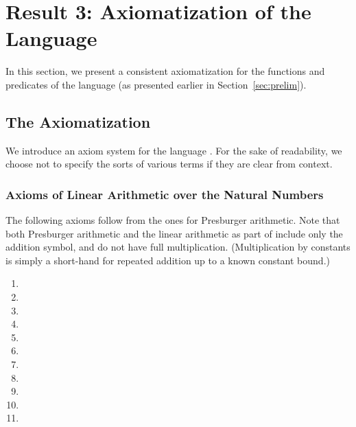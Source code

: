 \section{Result 3: Axiomatization  of the Language }
\label{sec:soundness}

In this section, we present a consistent
axiomatization  for the functions and predicates of the
language  (as presented earlier in Section~\ref{sec:prelim}).

\subsection{The Axiomatization }
\label{sec:axioms}

We introduce an axiom system  for the language .
For the sake of readability, we choose not to specify the
sorts of various terms if they are clear from context.

\subsubsection{Axioms of Linear Arithmetic over the Natural Numbers}

The following axioms follow from the ones for Presburger
arithmetic. Note that both Presburger arithmetic and the linear
arithmetic as part of  include only the addition symbol, and
do not have full multiplication. (Multiplication by constants is
simply a short-hand for repeated addition up to a known constant
bound.)

\begin{enumerate}

\item 
  
\item 

\item  

\item  

\item  

\item  

\item 

\item 

\item 



\item 

\item 

\end{enumerate}

